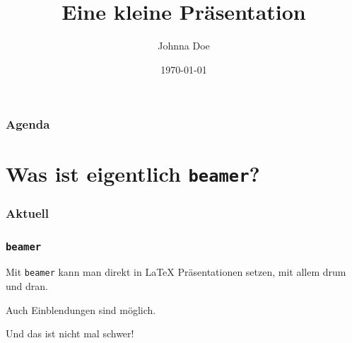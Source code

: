 \documentclass{beamer}
\begin{document}
\title{Eine kleine Präsentation}
\author{Johnna Doe}
\date{1970-01-01}

\begin{frame}
  \maketitle
\end{frame}

\begin{frame}
  \frametitle{Agenda}
  \tableofcontents{}
\end{frame}

\section{Was ist eigentlich \texttt{beamer}?}

\begin{frame}
  \frametitle{Aktuell}
  \tableofcontents[currentsection]{}
\end{frame}

\begin{frame}
  \frametitle{\texttt{beamer}}

  \onslide<+->

  Mit \texttt{beamer} kann man direkt in \LaTeX{} Präsentationen setzen, mit
  allem drum und dran.

  \onslide<+->

  \bigskip{}

  Auch Einblendungen sind möglich.

  \onslide<+->

  \bigskip{}

  Und das ist nicht mal schwer!

\end{frame}
\end{document}
